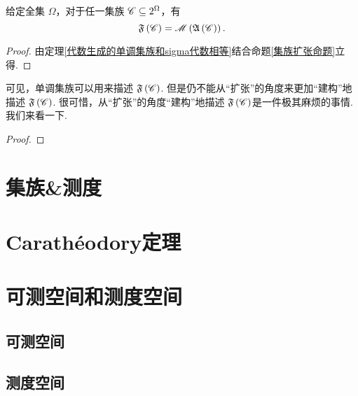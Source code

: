 \begin{corollary}
    给定全集 $\Omega$，对于任一集族 $\mathscr{C}\subseteq2^{\Omega}$，有
    \[{\mathfrak{F}}\left(\mathscr{C}\right)=\mathscr{M}\left( {\mathfrak{A}}\left( \mathscr{C} \right) \right).\]
\end{corollary}
\begin{proof}
    由定理\ref{代数生成的单调集族和sigma代数相等}结合命题\ref{集族扩张命题}立得.
\end{proof}
可见，单调集族可以用来描述 ${\mathfrak{F}}\left(\mathscr{C}\right)$. 但是仍不能从“扩张”的角度来更加“建构”地描述 ${\mathfrak{F}}\left(\mathscr{C}\right)$. 很可惜，从“扩张”的角度“建构”地描述 ${\mathfrak{F}}\left(\mathscr{C}\right)$是一件极其麻烦的事情. 我们来看一下.
\begin{proposition}\label{F(S)的复杂结构}
    
\end{proposition}
\begin{proof}
    
\end{proof}










\section{集族\&测度}


\subsection{}

\subsection{}






\section{Carathéodory定理}


\section{可测空间和测度空间}

\subsection{可测空间}

\subsection{测度空间}